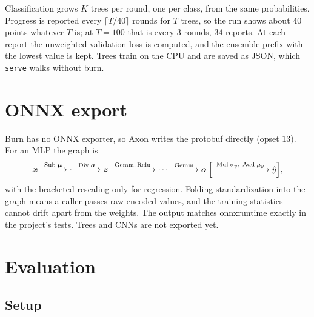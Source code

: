 \documentclass[11pt]{article}
\theoremstyle{plain}
\theoremstyle{definition}
\newcommand{\code}[1]{\texttt{#1}}
\begin{document}
Classification grows $K$ trees per round, one per class, from the same
probabilities. Progress is reported every $\lceil T/40 \rceil$ rounds for $T$
trees, so the run shows about $40$ points whatever $T$ is; at $T = 100$ that is
every $3$ rounds, $34$ reports. At each report the unweighted validation loss is
computed, and the ensemble prefix with the lowest value is kept. Trees train on
the CPU and are saved as JSON, which \code{serve} walks without burn.

\section{ONNX export}\label{sec:onnx}

Burn has no ONNX exporter, so Axon writes the protobuf directly (opset $13$).
For an MLP the graph is
\begin{equation}
  \bm{x} \xrightarrow{\;\text{Sub}\;\bm{\mu}\;} \cdot \xrightarrow{\;\text{Div}\;\bm{\sigma}\;} \bm{z}
  \xrightarrow{\;\text{Gemm},\,\text{Relu}\;} \cdots \xrightarrow{\;\text{Gemm}\;} \bm{o}
  \;\Bigl[\xrightarrow{\;\text{Mul}\;\sigma_y,\ \text{Add}\;\mu_y\;} \hat{y}\Bigr],
\end{equation}
with the bracketed rescaling only for regression. Folding standardization into
the graph means a caller passes raw encoded values, and the training statistics
cannot drift apart from the weights. The output matches onnxruntime exactly in
the project's tests. Trees and CNNs are not exported yet.

\section{Evaluation}\label{sec:eval}

\subsection{Setup}
\end{document}
